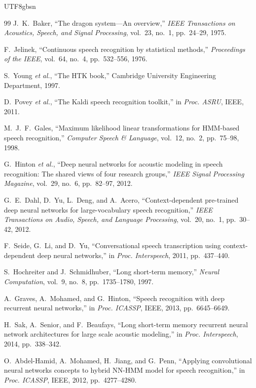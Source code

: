 \documentclass[12pt,a4paper]{article}
\newcommand{\etal}{\textit{et al.}}
\begin{document}
\begin{CJK}{UTF8}{gbsn}
\begin{thebibliography}{99}
J.~K.~Baker,
``The dragon system---An overview,''
\textit{IEEE Transactions on Acoustics, Speech, and Signal Processing}, vol.~23, no.~1, pp.~24--29, 1975.

F.~Jelinek,
``Continuous speech recognition by statistical methods,''
\textit{Proceedings of the IEEE}, vol.~64, no.~4, pp.~532--556, 1976.

S.~Young \etal,
``The HTK book,''
Cambridge University Engineering Department, 1997.

D.~Povey \etal,
``The Kaldi speech recognition toolkit,''
in \textit{Proc. ASRU}, IEEE, 2011.

M.~J.~F.~Gales,
``Maximum likelihood linear transformations for HMM-based speech recognition,''
\textit{Computer Speech \& Language}, vol.~12, no.~2, pp.~75--98, 1998.

G.~Hinton \etal,
``Deep neural networks for acoustic modeling in speech recognition: The shared views of four research groups,''
\textit{IEEE Signal Processing Magazine}, vol.~29, no.~6, pp.~82--97, 2012.

G.~E.~Dahl, D.~Yu, L.~Deng, and A.~Acero,
``Context-dependent pre-trained deep neural networks for large-vocabulary speech recognition,''
\textit{IEEE Transactions on Audio, Speech, and Language Processing}, vol.~20, no.~1, pp.~30--42, 2012.

F.~Seide, G.~Li, and D.~Yu,
``Conversational speech transcription using context-dependent deep neural networks,''
in \textit{Proc. Interspeech}, 2011, pp.~437--440.

S.~Hochreiter and J.~Schmidhuber,
``Long short-term memory,''
\textit{Neural Computation}, vol.~9, no.~8, pp.~1735--1780, 1997.

A.~Graves, A.~Mohamed, and G.~Hinton,
``Speech recognition with deep recurrent neural networks,''
in \textit{Proc. ICASSP}, IEEE, 2013, pp.~6645--6649.

H.~Sak, A.~Senior, and F.~Beaufays,
``Long short-term memory recurrent neural network architectures for large scale acoustic modeling,''
in \textit{Proc. Interspeech}, 2014, pp.~338--342.

O.~Abdel-Hamid, A.~Mohamed, H.~Jiang, and G.~Penn,
``Applying convolutional neural networks concepts to hybrid NN-HMM model for speech recognition,''
in \textit{Proc. ICASSP}, IEEE, 2012, pp.~4277--4280.


\end{thebibliography}
\end{CJK}
\end{document}

